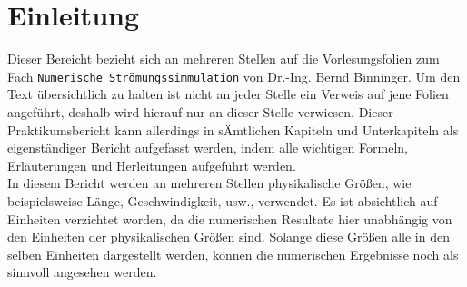 \chapter{Einleitung}
Dieser Bereicht bezieht sich an mehreren Stellen auf die Vorlesungsfolien zum Fach \texttt{Numerische Str\"omungssimmulation} von Dr.-Ing. Bernd Binninger. Um den Text \"ubersichtlich zu halten ist nicht an jeder Stelle ein Verweis auf jene Folien angef\"uhrt, deshalb wird hierauf nur an dieser Stelle verwiesen. Dieser Praktikumsbericht kann allerdings in s\"Amtlichen Kapiteln und Unterkapiteln als eigenst\"andiger Bericht aufgefasst werden, indem alle wichtigen Formeln, Erl\"auterungen und Herleitungen aufgef\"uhrt werden. \\[0.5cm]
In diesem Bericht werden an mehreren Stellen physikalische Gr\"o\ss{}en, wie beispielsweise L\"ange, Geschwindigkeit, usw., verwendet. Es ist absichtlich auf Einheiten verzichtet worden, da die numerischen Resultate hier unabh\"angig von den Einheiten der physikalischen Gr\"o\ss{}en sind. Solange diese Gr\"o\ss{}en alle in den selben Einheiten dargestellt werden, k\"onnen die numerischen Ergebnisse noch als sinnvoll angesehen werden.